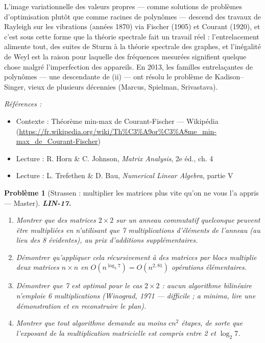 \documentclass[11pt]{article}
\newtheorem{problem}{Problème}
\newenvironment{refs}{\par\small\noindent\emph{Références :}\begin{itemize}\setlength\itemsep{0pt}}{\end{itemize}\normalsize}
\begin{document}
\noindent L'image variationnelle des valeurs propres --- comme solutions de problèmes
d'optimisation plutôt que comme racines de polynômes --- descend des travaux de Rayleigh sur les
vibrations (années 1870) via Fischer (1905) et Courant (1920), et c'est sous cette forme que la
théorie spectrale fait un travail réel : l'entrelacement alimente tout, des suites de Sturm à la
théorie spectrale des graphes, et l'inégalité de Weyl est la raison pour laquelle des fréquences
mesurées signifient quelque chose malgré l'imperfection des appareils. En 2013, les familles
entrelaçantes de polynômes --- une descendante de (ii) --- ont résolu le problème de Kadison--Singer,
vieux de plusieurs décennies (Marcus, Spielman, Srivastava).

\begin{refs}
\item Contexte : Théorème min-max de Courant-Fischer --- Wikipédia (\url{https://fr.wikipedia.org/wiki/Th%C3%A9or%C3%A8me_min-max_de_Courant-Fischer})
\item Lecture : R. Horn \& C. Johnson, \textit{Matrix Analysis}, 2e éd., ch. 4
\item Lecture : L. Trefethen \& D. Bau, \textit{Numerical Linear Algebra}, partie V
\end{refs}

\bigskip

\begin{problem}[{Strassen : multiplier les matrices plus vite qu'on ne vous l'a appris --- Master}]
\textbf{LIN-17.} \begin{enumerate}
\item[(i)] Montrer que des matrices $2 \times 2$ sur un anneau commutatif
quelconque peuvent être multipliées en n'utilisant que 7 multiplications d'éléments de l'anneau (au
lieu des 8 évidentes), au prix d'additions supplémentaires.
\item[(ii)] Démontrer qu'appliquer cela récursivement à des matrices
par blocs multiplie deux matrices $n \times n$ en $O(n^{\log_2 7}) = O(n^{2{,}81})$ opérations
élémentaires.
\item[(iii)] Démontrer que 7 est optimal pour le cas $2 \times 2$ : aucun algorithme bilinéaire n'emploie 6
multiplications (Winograd, 1971 --- difficile ; a minima, lire une démonstration et en reconstruire le
plan).
\item[(iv)] Montrer que tout algorithme demande au moins $cn^2$ étapes, de sorte que l'exposant de la
multiplication matricielle est compris entre 2 et $\log_2 7$.
\end{enumerate}

\end{problem}
\end{document}

